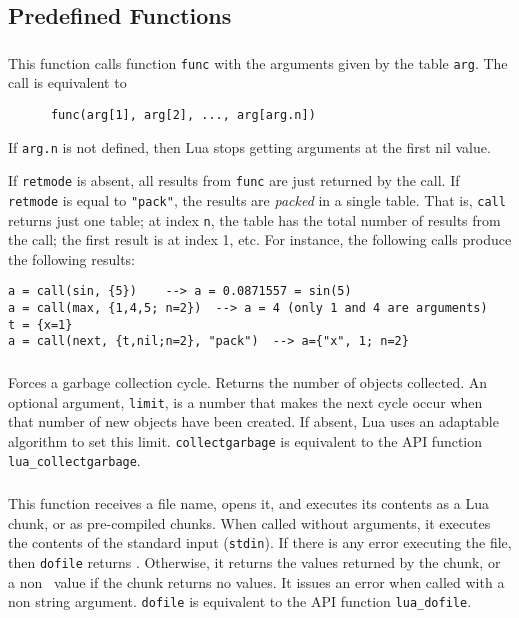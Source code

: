 \subsection{Predefined Functions} \label{predefined}

\subsubsection*{\ff {}}
This function calls function \verb|func| with
the arguments given by the table \verb|arg|.
The call is equivalent to
\begin{verbatim}
      func(arg[1], arg[2], ..., arg[arg.n])
\end{verbatim}
If \verb|arg.n| is not defined,
then Lua stops getting arguments at the first nil value.

If \verb|retmode| is absent,
all results from \verb|func| are just returned by the call.
If \verb|retmode| is equal to \verb|"pack"|,
the results are \emph{packed} in a single table.
That is, \verb|call| returns just one table;
at index \verb|n|, the table has the total number of results
from the call;
the first result is at index 1, etc.
For instance, the following calls produce the following results:
\begin{verbatim}
a = call(sin, {5})    --> a = 0.0871557 = sin(5)
a = call(max, {1,4,5; n=2})  --> a = 4 (only 1 and 4 are arguments)
t = {x=1}
a = call(next, {t,nil;n=2}, "pack")  --> a={"x", 1; n=2}
\end{verbatim}

\subsubsection*{\ff {}}
Forces a garbage collection cycle.
Returns the number of objects collected.
An optional argument, \verb|limit|, is a number that
makes the next cycle occur when that number of new
objects have been created.
If absent, Lua uses an adaptable algorithm to set
this limit.
\verb|collectgarbage| is equivalent to
the API function \verb|lua_collectgarbage|.

\subsubsection*{\ff {}}
This function receives a file name,
opens it, and executes its contents as a Lua chunk,
or as pre-compiled chunks.
When called without arguments,
it executes the contents of the standard input (\verb|stdin|).
If there is any error executing the file,
then \verb|dofile| returns \nil.
Otherwise, it returns the values returned by the chunk,
or a non \nil\ value if the chunk returns no values.
It issues an error when called with a non string argument.
\verb|dofile| is equivalent to the API function \verb|lua_dofile|.

